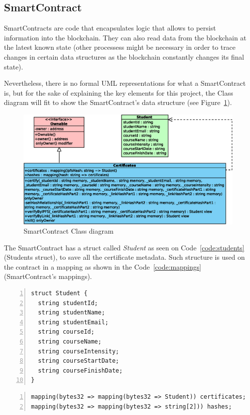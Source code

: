 \documentclass[runningheads]{llncs}
\begin{document}
\subsection{SmartContract} \label{ssec:smartcontract}
SmartContracts are code that encapsulates logic that allows to persist information into the blockchain. They can also read data from the blockchain at the latest known state (other processess might be necessary in order to trace changes in certain data structures as the blockchain constantly changes its final state).

Nevertheless, there is no formal UML representations for what a SmartContract is, but for the sake of explaining the key elements for this project, the Class diagram will fit to show the SmartContract's data structure (see Figure~\ref{fig10}).

\begin{figure}
\includegraphics[width=\textwidth]{10-SmartContract.eps}
\caption{SmartContract Class diagram}
\label{fig10}
\end{figure}

The SmartContract has a struct called \emph{Student} as seen on Code~\ref{code:students} (Students struct), to save all the certificate metadata. Such structure is used on the contract in a mapping as shown in the Code~\ref{code:mappings} (SmartContract's mappings).

\begin{Verbatim}[frame=single,numbers=left,label=Students struct]
struct Student {
  string studentId;
  string studentName;
  string studentEmail;
  string courseId;
  string courseName;
  string courseIntensity;
  string courseStartDate;
  string courseFinishDate;
}
\end{Verbatim}
\label{code:students}

\begin{Verbatim}[frame=single,numbers=left,label=SmartContract's mappings]
mapping(bytes32 => mapping(bytes32 => Student)) certificates;
mapping(bytes32 => mapping(bytes32 => string[2])) hashes;
\end{Verbatim}
\label{code:mappings}
\end{document}
